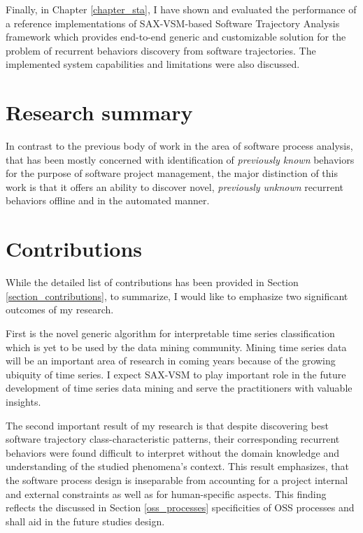 Finally, in Chapter \ref{chapter_sta}, I have shown and evaluated the performance of a reference implementations of SAX-VSM-based Software Trajectory Analysis framework which provides end-to-end generic and customizable solution for the problem of recurrent behaviors discovery from software trajectories. The implemented system capabilities and limitations were also discussed.

\section{Research summary}
In contrast to the previous body of work in the area of software process analysis, that has been mostly concerned with identification of \textit{previously known} behaviors for the purpose of software project management, the major distinction of this work is that it offers an ability to discover novel, \textit{previously unknown} recurrent behaviors offline and in the automated manner.

\section{Contributions}
While the detailed list of contributions has been provided in Section \ref{section_contributions}, to summarize, I would like to emphasize two significant outcomes of my research.

First is the novel generic algorithm for interpretable time series classification which is yet to be used by the data mining community. Mining time series data will be an important area of research in coming years because of the growing ubiquity of time series. I expect SAX-VSM to play important role in the future development of time series data mining and serve the practitioners with valuable insights.

The second important result of my research is that despite discovering best software trajectory class-characteristic patterns, their corresponding recurrent behaviors were found difficult to interpret without the domain knowledge and understanding of the studied phenomena's context. This result emphasizes, that the software process design is inseparable from accounting for a project internal and external constraints as well as for human-specific aspects. This finding reflects the discussed in Section \ref{oss_processes} specificities of OSS processes and shall aid in the future studies design.

